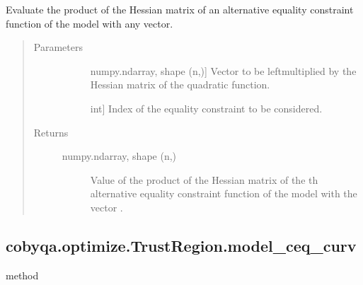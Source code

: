 \documentclass[letterpaper,10pt,english]{sphinxmanual}
\begin{document}
\begin{fulllineitems}
\begin{fulllineitems}
\label{\detokenize{refs/generated/cobyqa.optimize.TrustRegion.model_ceq_alt_hessp:cobyqa.optimize.TrustRegion.model_ceq_alt_hessp}}
\sphinxAtStartPar
Evaluate the product of the Hessian matrix of an alternative equality
constraint function of the model with any vector.
\begin{quote}\begin{description}
\item[{Parameters}] \leavevmode\begin{description}
\item[{}] \leavevmode{[}numpy.ndarray, shape (n,){]}
\sphinxAtStartPar
Vector to be left\sphinxhyphen{}multiplied by the Hessian matrix of the quadratic
function.

\item[{}] \leavevmode{[}int{]}
\sphinxAtStartPar
Index of the equality constraint to be considered.

\end{description}

\item[{Returns}] \leavevmode\begin{description}
\item[{numpy.ndarray, shape (n,)}] \leavevmode
\sphinxAtStartPar
Value of the product of the Hessian matrix of the \sphinxhyphen{}th alternative
equality constraint function of the model with the vector .

\end{description}

\end{description}\end{quote}

\end{fulllineitems}



\subsection{cobyqa.optimize.TrustRegion.model\_ceq\_curv}
\label{\detokenize{refs/generated/cobyqa.optimize.TrustRegion.model_ceq_curv:cobyqa-optimize-trustregion-model-ceq-curv}}\label{\detokenize{refs/generated/cobyqa.optimize.TrustRegion.model_ceq_curv::doc}}
\sphinxAtStartPar
method


\end{fulllineitems}
\end{document}
